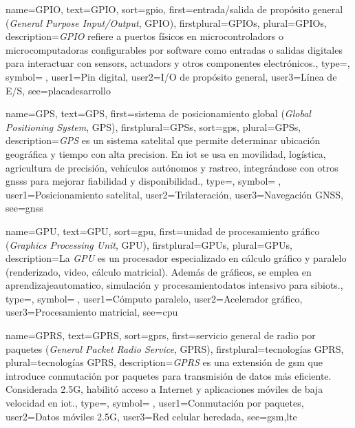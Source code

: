 	{
		name={GPIO},
		text={GPIO},
		sort={gpio},
		first={entrada/salida de prop{\'o}sito general (\textit{General Purpose Input/Output}, GPIO)},
		firstplural={GPIOs},
		plural={GPIOs},
		description={\emph{GPIO} refiere a \glspl{puerto} f{\'i}sicos en \glspl{microcontrolador} o microcomputadoras configurables por software como entradas o salidas digitales para interactuar con \glspl{sensor}, \glspl{actuador} y otros componentes electr{\'o}nicos.},
		type=\glsdefaulttype,
		symbol={📍},
		user1={Pin digital},
		user2={I/O de prop{\'o}sito general},
		user3={L{\'i}nea de E/S},
		see={placadesarrollo}
	}
	
	{
		name={GPS},
		text={GPS},
		first={sistema de posicionamiento global (\textit{Global Positioning System}, GPS)},
		firstplural={GPSs},
		sort={gps},
		plural={GPSs},
		description={\emph{GPS} es un sistema satelital que permite determinar ubicaci{\'o}n geogr{\'a}fica y tiempo con alta \gls{precision}. En \gls{iot} se usa en movilidad, log{\'i}stica, agricultura de precisi{\'o}n, veh{\'i}culos aut{\'o}nomos y rastreo, integr{\'a}ndose con otros \glspl{gnss} para mejorar \gls{fiabilidad} y \gls{disponibilidad}.},
		type=\glsdefaulttype,
		symbol={📡},
		user1={Posicionamiento satelital},
		user2={Trilateraci{\'o}n},
		user3={Navegaci{\'o}n GNSS},
		see={gnss}
	}
	
	{
		name={GPU},
		text={GPU},
		sort={gpu},
		first={unidad de procesamiento gr{\'a}fico (\textit{Graphics Processing Unit}, GPU)},
		firstplural={GPUs},
		plural={GPUs},
		description={La \emph{GPU} es un procesador especializado en c{\'a}lculo gr{\'a}fico y paralelo (renderizado, video, c{\'a}lculo matricial). Adem{\'a}s de gr{\'a}ficos, se emplea en \gls{aprendizajeautomatico}, simulaci{\'o}n y \gls{procesamientodatos} intensivo para \glspl{sibiot}.},
		type=\glsdefaulttype,
		symbol={🧮},
		user1={C{\'o}mputo paralelo},
		user2={Acelerador gr{\'a}fico},
		user3={Procesamiento matricial},
		see={cpu}
	}
	
	{
		name={GPRS},
		text={GPRS},
		sort={gprs},
		first={servicio general de radio por paquetes (\textit{General Packet Radio Service}, GPRS)},
		firstplural={tecnolog{\'i}as GPRS},
		plural={tecnolog{\'i}as GPRS},
		description={\emph{GPRS} es una extensi{\'o}n de \gls{gsm} que introduce conmutaci{\'o}n por paquetes para transmisi{\'o}n de \glspl{dato} m{\'a}s eficiente. Considerada 2.5G, habilit{\'o} acceso a Internet y aplicaciones m{\'o}viles de baja velocidad en \gls{iot}.},
		type=\glsdefaulttype,
		symbol={📶},
		user1={Conmutaci{\'o}n por paquetes},
		user2={Datos m{\'o}viles 2.5G},
		user3={Red celular heredada},
		see={gsm,lte}
	}
	
